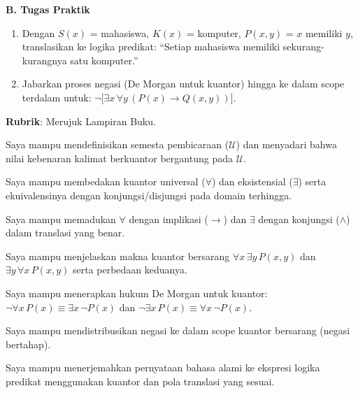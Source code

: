 \documentclass[../main]{subfiles}
\begin{document}
\begin{asesmen}
\textbf{B. Tugas Praktik}
\begin{enumerate}
  \item Dengan $S(x)$ = mahasiswa, $K(x)$ = komputer, $P(x,y)$ = $x$ memiliki $y$, translasikan ke logika predikat: ``Setiap mahasiswa memiliki sekurang-kurangnya satu komputer.''
  \item Jabarkan proses negasi (De Morgan untuk kuantor) hingga ke dalam scope terdalam untuk: $\neg \big[ \exists x \, \forall y \, (P(x) \rightarrow Q(x,y)) \big]$.
\end{enumerate}

\textbf{Rubrik}: Merujuk Lampiran Buku.
\end{asesmen}


\begin{checklist}
  \item Saya mampu mendefinisikan semesta pembicaraan ($\mathcal{U}$) dan menyadari bahwa nilai kebenaran kalimat berkuantor bergantung pada $\mathcal{U}$.
  \item Saya mampu membedakan kuantor universal ($\forall$) dan eksistensial ($\exists$) serta ekuivalensinya dengan konjungsi/disjungsi pada domain terhingga.
  \item Saya mampu memadukan $\forall$ dengan implikasi ($\rightarrow$) dan $\exists$ dengan konjungsi ($\land$) dalam translasi yang benar.
  \item Saya mampu menjelaskan makna kuantor bersarang $\forall x \, \exists y \, P(x,y)$ dan $\exists y \, \forall x \, P(x,y)$ serta perbedaan keduanya.
  \item Saya mampu menerapkan hukum De Morgan untuk kuantor: $\neg \forall x \, P(x) \equiv \exists x \, \neg P(x)$ dan $\neg \exists x \, P(x) \equiv \forall x \, \neg P(x)$.
  \item Saya mampu mendistribusikan negasi ke dalam scope kuantor bersarang (negasi bertahap).
  \item Saya mampu menerjemahkan pernyataan bahasa alami ke ekspresi logika predikat menggunakan kuantor dan pola translasi yang sesuai.
\end{checklist}

\end{document}
